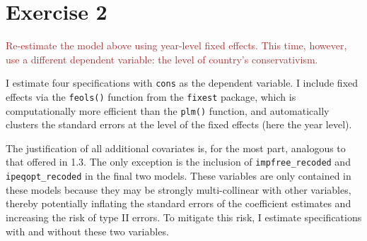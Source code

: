\documentclass[
]{article}
\begin{document}
\hypertarget{exercise-2}{%
\section{Exercise 2}\label{exercise-2}}

\textcolor{brown}{Re-estimate the model above using year-level fixed effects. This time, however, use a different dependent variable: the level of country’s conservativism.}

I estimate four specifications with \texttt{cons} as the dependent
variable. I include fixed effects via the \texttt{feols()} function from
the \texttt{fixest} package, which is computationally more efficient
than the \texttt{plm()} function, and automatically clusters the
standard errors at the level of the fixed effects (here the year level).

The justification of all additional covariates is, for the most part,
analogous to that offered in 1.3. The only exception is the inclusion of
\texttt{impfree\_recoded} and \texttt{ipeqopt\_recoded} in the final two
models. These variables are only contained in these models because they
may be strongly multi-collinear with other variables, thereby
potentially inflating the standard errors of the coefficient estimates
and increasing the risk of type II errors. To mitigate this risk, I
estimate specifications with and without these two variables.
\end{document}
